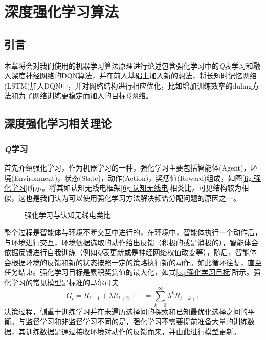 \chapter{深度强化学习算法}
\section{引言}
本章将会对我们使用的机器学习算法原理进行论述包含强化学习中的\textit{Q}表学习和融入深度神经网络的DQN算法，并在前人基础上加入新的想法，将长短时记忆网络(LSTM)加入DQN中，并对网络结构进行相应优化，比如增加训练效率的duling方法和为了网络训练更稳定而加入的目标\textit{Q}网络。
\section{深度强化学习相关理论}
\subsection{\textit{Q}学习}
首先介绍强化学习，作为机器学习的一种，强化学习主要包括智能体(Agent)，环境(Environment)，状态(State)，动作(Action)，奖惩值(Reward)组成，如图\ref{fig:强化学习}所示。将其如认知无线电框架\ref{fig:认知无线电}相类比，可见结构较为相似，这也是我们认为可以使用强化学习方法解决频谱分配问题的原因之一。
\begin{figure}[htbp]
	\begin{minipage}{\textwidth}
		\centering
		\subfigure{\label{fig:强化学习}}\addtocounter{subfigure}{-2}
		\hspace{1em}
		\subfigure{\label{fig:认知无线电}}\addtocounter{subfigure}{-2}
		\hspace{1em}	
	\end{minipage}
	\vspace{0.2em}
	\caption{强化学习与认知无线电类比}\label{fig:强化学习类比认知无线电}
\end{figure}
整个过程是智能体与环境不断交互中进行的，在环境中，智能体执行一个动作后，与环境进行交互，环境依据选取的动作给出反馈（积极的或是消极的），智能体会依据反馈进行自我训练（例如\textit{Q}表更新或是神经网络权值改变等），随后，智能体会根据环境的反馈和新的状态按照一定的策略执行新的动作。如此循环往复，直至任务结束。强化学习目标是累积奖赏值的最大化，如式\ref{eq:强化学习目标}所示。强化学习的常见模型是标准的马尔可夫
\begin{equation}\label{eq:强化学习目标}
G_{t}=R_{t+1}+\lambda R_{t+2}+\cdots=\sum_{k=0}^{\infty}\lambda^{k}R_{t+k+1}
\end{equation}
决策过程，侧重于训练学习并在未遍历选择间的探索和已知最优化选择之间的平衡。与监督学习和非监督学习不同的是，强化学习不需要提前准备大量的训练数据，其训练数据是通过接收环境对动作的反馈而来，并由此进行模型更新。

